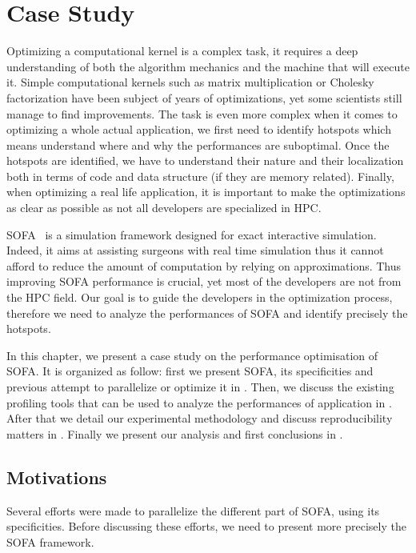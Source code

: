 \chapter{Case Study}
\label{chap:perf}

Optimizing a computational kernel is a complex task, it requires a deep understanding of both the algorithm mechanics and the machine that will execute it.
Simple computational kernels such as matrix multiplication or Cholesky factorization have been subject of years of optimizations, yet some scientists still manage to find improvements.
The task is even more complex when it comes to optimizing a whole actual application, we first need to identify hotspots which means understand where and why the performances are suboptimal.
Once the hotspots are identified, we have to understand their nature and their localization both in terms of code and data structure (if they are memory related).
Finally, when optimizing a real life application, it is important to make the optimizations as clear as possible as not all developers are specialized in \gls{HPC}.

\gls{SOFA}~\cite{Allard07SOFA} is a simulation framework designed for exact interactive simulation.
Indeed, it aims at assisting surgeons with real time simulation thus  it cannot afford to reduce the amount of computation by relying on approximations.
Thus improving \gls{SOFA} performance is crucial, yet most of the developers are not from the \gls{HPC} field.
Our goal is to guide the developers in the optimization process, therefore we need to analyze the  performances of \gls{SOFA} and identify precisely the hotspots.

In this chapter, we present a case study on the performance optimisation of \gls{SOFA}.
It is organized as follow: first we present \gls{SOFA}, its specificities and previous attempt to parallelize or optimize it in .
Then, we discuss the existing profiling tools that can be used to analyze the performances of application in .
After that we detail our experimental methodology and discuss reproducibility matters in .
Finally we present our analysis and first conclusions in .

\section{Motivations}
\label{sec:motivations}

Several efforts were made to parallelize the different part of \gls{SOFA}, using its specificities.
Before discussing these efforts, we need to present more precisely the \gls{SOFA} framework.

